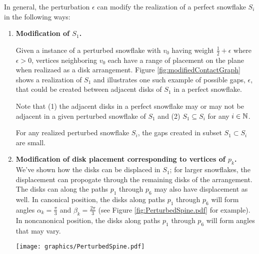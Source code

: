 In general, the perturbation $\epsilon$ can modify the realization of a perfect snowflake $S_i$ in the following ways:
\begin{enumerate}
\item \textbf{Modification of $S_1$.} 

Given a instance of a perturbed snowflake with $v_0$ having weight $\frac{1}{2} + \epsilon$ where $\epsilon > 0$, vertices neighboring $v_0$ each have a range of placement on the plane when realizaed as a disk arrangement. 
Figure \ref{fig:modifiedContactGraph} shows a realization of $S_1$ and illustrates one such example of possible gaps, $\epsilon$, that could be created between adjacent disks of $S_1$ in a perfect snowflake.  

Note that (1) the adjacent disks in a perfect snowflake may or may not be adjacent in a given perturbed snowflake of $S_1$ and (2) $S_1 \subseteq S_i$ for any $i \in {\mathbb{N}}$.  

\begin{lem}\label{lem:s1Small}
For any realized perturbed snowflake $S_i$, the gaps created in subset $S_1 \subset S_i$ are small.
\end{lem}

\item \textbf{Modification of disk placement corresponding to vertices of $p_k$.}
We've shown how the disks can be displaced in $S_1$; for larger snowflakes, the displacement can propogate through the remaining disks of the arrangement.  
The disks can along the paths $p_1$ through $p_6$ may also have displacement as well.  
In canonical position, the disks along paths $p_1$ through $p_6$ will form angles $\alpha_k =\frac{\pi}{3} $ and $\beta_k=\frac{2\pi}{3}$ (see Figure \ref{fig:PerturbedSpine.pdf} for example).  
In noncanonical position, the disks along paths $p_1$ through $p_6$ will form angles that may vary.  

\begin{minipage}{\linewidth}
\begin{center}
\texttt{[image: graphics/PerturbedSpine.pdf]}
\label{fig:PerturbedSpine.pdf}
\end{center}
\end{minipage}


\end{enumerate}
